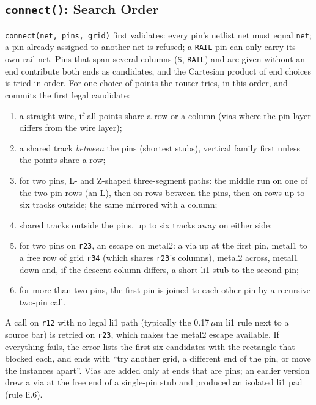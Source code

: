\documentclass[conference]{IEEEtran}
\newcommand{\um}{\,$\mu$m}
\newcommand{\code}[1]{\texttt{#1}}
\begin{document}
\subsection{\code{connect()}: Search Order}
\label{sec:connect}
\code{connect(net, pins, grid)} first validates: every pin's netlist net must equal \code{net}; a pin already assigned to another net is refused; a \code{RAIL} pin can only carry its own rail net. Pins that span several columns (\code{S}, \code{RAIL}) and are given without an end contribute both ends as candidates, and the Cartesian product of end choices is tried in order. For one choice of points the router tries, in this order, and commits the first legal candidate:
\begin{enumerate}
\item a straight wire, if all points share a row or a column (vias where the pin layer differs from the wire layer);
\item a shared track \emph{between} the pins (shortest stubs), vertical family first unless the points share a row;
\item for two pins, L- and Z-shaped three-segment paths: the middle run on one of the two pin rows (an L), then on rows between the pins, then on rows up to six tracks outside; the same mirrored with a column;
\item shared tracks outside the pins, up to six tracks away on either side;
\item for two pins on \code{r23}, an escape on metal2: a via up at the first pin, metal1 to a free row of grid \code{r34} (which shares \code{r23}'s columns), metal2 across, metal1 down and, if the descent column differs, a short li1 stub to the second pin;
\item for more than two pins, the first pin is joined to each other pin by a recursive two-pin call.
\end{enumerate}
A call on \code{r12} with no legal li1 path (typically the 0.17\um{} li1 rule next to a source bar) is retried on \code{r23}, which makes the metal2 escape available. If everything fails, the error lists the first six candidates with the rectangle that blocked each, and ends with ``try another grid, a different end of the pin, or move the instances apart''. Vias are added only at ends that are pins; an earlier version drew a via at the free end of a single-pin stub and produced an isolated li1 pad (rule li.6).
\end{document}
